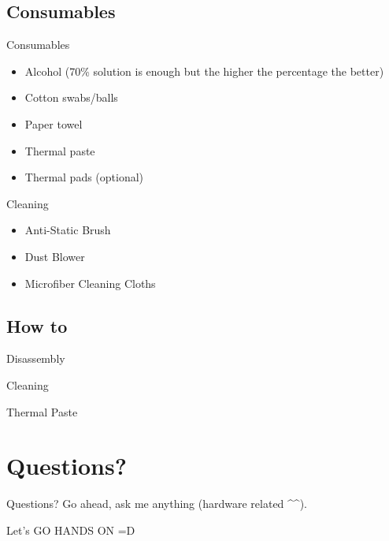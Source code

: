 \documentclass{beamer}
\begin{document}
\subsection{Consumables}

\begin{frame}{Consumables}
    \begin{itemize}
      \item Alcohol (70\% solution is enough but the higher the percentage the better)
      \item Cotton swabs/balls
      \item Paper towel
      \item Thermal paste
      \item Thermal pads (optional)
    \end{itemize}
\end{frame}

\begin{frame}{Cleaning}
    \begin{itemize}
        \item Anti-Static Brush
        \item Dust Blower
        \item Microfiber Cleaning Cloths
    \end{itemize}
\end{frame}

\subsection{How to}

\begin{frame}{Disassembly}
\end{frame}

\begin{frame}{Cleaning}
\end{frame}

\begin{frame}{Thermal Paste}
\end{frame}

\section{Questions?}

\begin{frame}{Questions?}
    Go ahead, ask me anything (hardware related \textasciicircum \textasciicircum).
\end{frame}

\begin{frame}{Let's GO}
    HANDS ON =D
\end{frame}
\end{document}
